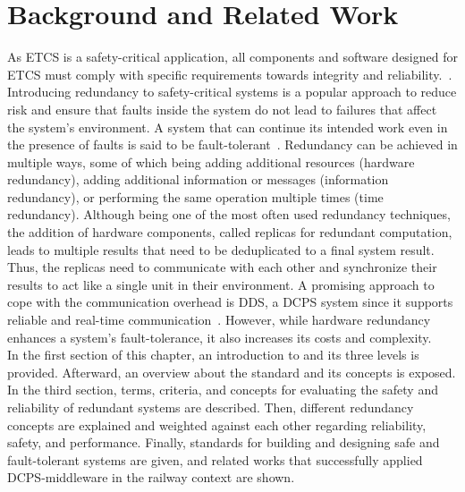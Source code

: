  \chapter{Background and Related Work}
\label{chptr:concepts}

As ETCS is a safety-critical application, all components and software designed for ETCS must comply with specific requirements towards integrity and reliability.~\cite{OnBoardUnitSafetyTesting}. 
Introducing redundancy to safety-critical systems is a popular approach to reduce risk and ensure that faults inside the system do not lead to failures that affect the system's environment.
A system that can continue its intended work even in the presence of faults is said to be fault-tolerant~\cite{BarryFaultToleranceAnalysis}.
Redundancy can be achieved in multiple ways, some of which being adding additional resources (hardware redundancy), adding additional information or messages (information redundancy), or performing the same operation multiple times (time redundancy).
Although being one of the most often used redundancy techniques, the addition of hardware components, called replicas for redundant computation, leads to multiple results that need to be deduplicated to a final system result.
Thus, the replicas need to communicate with each other and synchronize their results to act like a single unit in their environment.
A promising approach to cope with the communication overhead is \gls*{DDS}, a \gls*{DCPS} system since it supports reliable and real-time communication~\cite{omgDDSspec}.
However, while hardware redundancy enhances a system's fault-tolerance, it also increases its costs and complexity.
\\

In the first section of this chapter, an introduction to  and its three levels is provided.
Afterward, an overview about the  standard and its concepts is exposed.
In the third section, terms, criteria, and concepts for evaluating the safety and reliability of redundant systems are described.
Then, different redundancy concepts are explained and weighted against each other regarding reliability, safety, and performance.
Finally, standards for building and designing safe and fault-tolerant systems are given, and related works that successfully applied \gls*{DCPS}-middleware in the railway context are shown.

